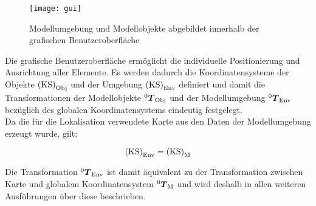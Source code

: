 \begin{figure}[!ht]
	\begin{center}
		\texttt{[image: gui]}
		\caption{Modellumgebung und Modellobjekte abgebildet innerhalb der grafischen Benutzeroberfläche}
		\label{fig.modscene}
	\end{center}
\end{figure}

\prever{
}

Die grafische Benutzeroberfläche ermöglicht die individuelle Positionierung und Ausrichtung aller Elemente. Es werden dadurch die Koordinatensysteme der Objekte ${\mathrm{(KS)}}_{\mathrm{Obj}}$ und der Umgebung ${\mathrm{(KS)}}_{\mathrm{Env}}$ definiert und damit die Transformationen der Modellobjekte ${^{\mathrm{0}}\mbox{\boldmath{$T$}}_{\mathrm{Obj}}}$ und der Modellumgebung ${^{\mathrm{0}}\mbox{\boldmath{$T$}}_{\mathrm{Env}}}$ bezüglich des globalen Koordinatensystems eindeutig festgelegt.\\
Da die für die Lokalisation verwendete Karte aus den Daten der Modellumgebung erzeugt wurde, gilt:

\begin{equation}
{\mathrm{(KS)}}_{\mathrm{Env}} = {\mathrm{(KS)}}_{\mathrm{M}}
\end{equation}


Die Transformation ${^{\mathrm{0}}\mbox{\boldmath{$T$}}_{\mathrm{Env}}}$ ist damit äquivalent zu der Transformation zwischen Karte und globalem Koordinatensystem ${^{\mathrm{0}}\mbox{\boldmath{$T$}}_{\mathrm{M}}}$ und wird deshalb in allen weiteren Ausführungen über diese beschrieben.\\
\prever{
}

